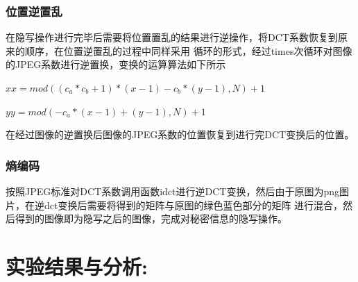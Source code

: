 \documentclass[a4paper,11pt,UTF8]{ctexart}
\begin{document}
      \subsubsection{位置逆置乱}
        在隐写操作进行完毕后需要将位置置乱的结果进行逆操作，将DCT系数恢复到原来的顺序，在位置逆置乱的过程中同样采用
        循环的形式，经过times次循环对图像的JPEG系数进行逆置换，变换的运算算法如下所示\par
        $xx=mod((c_a*c_b+1)*(x-1)-c_b*(y-1),N)+1$\par
        $yy=mod(-c_a*(x-1)+(y-1),N)+1$\par
        在经过图像的逆置换后图像的JPEG系数的位置恢复到进行完DCT变换后的位置。
      \subsubsection{熵编码}
        按照JPEG标准对DCT系数调用函数idct进行逆DCT变换，然后由于原图为png图片，在逆dct变换后需要将得到的矩阵与原图的绿色蓝色部分的矩阵
        进行混合，然后得到的图像即为隐写之后的图像，完成对秘密信息的隐写操作。



\section{实验结果与分析:}
\end{document}
